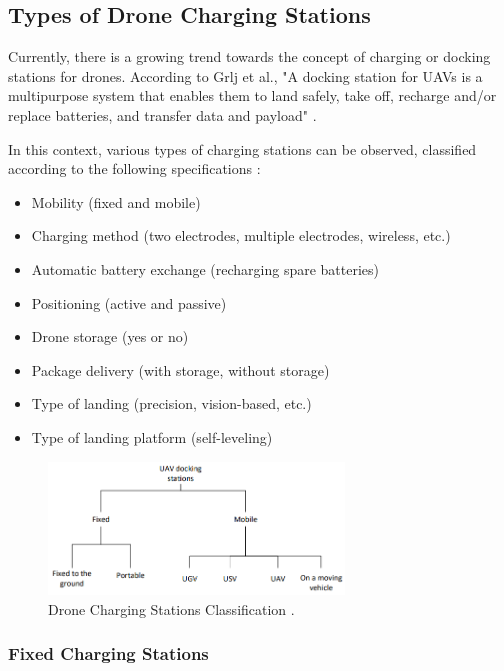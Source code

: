 \subsection{Types of Drone Charging Stations}

    Currently, there is a growing trend towards the concept of charging or docking stations for drones. According to Grlj et al., "A docking station for UAVs is a multipurpose system that enables them to land safely, take off, recharge and/or replace batteries, and transfer data and payload" \cite{grlj_docking_stations}.

    In this context, various types of charging stations can be observed, classified according to the following specifications \cite{grlj_docking_stations}:

    \begin{itemize}
        \item Mobility (fixed and mobile)
        \item Charging method (two electrodes, multiple electrodes, wireless, etc.)
        \item Automatic battery exchange (recharging spare batteries)
        \item Positioning (active and passive)
        \item Drone storage (yes or no)
        \item Package delivery (with storage, without storage)
        \item Type of landing (precision, vision-based, etc.)
        \item Type of landing platform (self-leveling)
    \end{itemize}

    \begin{figure}[h!]
        \centering
        \includegraphics[width=0.7\textwidth]{pictures/charging_classification.png}
        \caption{Drone Charging Stations Classification \cite{grlj_docking_stations}.}
        \label{fig:charging_classification}
    \end{figure}

\subsubsection{Fixed Charging Stations}

